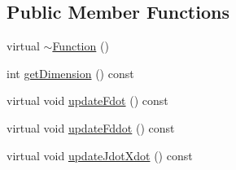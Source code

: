 \subsection*{Public Member Functions}
\begin{DoxyCompactItemize}
\item 
virtual \hyperlink{classocra_1_1Function_a1889abdbc50386e4b4710912dbba89bd}{$\sim$\+Function} ()
\item 
int \hyperlink{classocra_1_1Function_ae07e918d152c0cfdefaf0721c25cce33}{get\+Dimension} () const 
\item 
virtual void \hyperlink{classocra_1_1Function_a9539d82e42b9ec8c7cb9fa062b1b4f66}{update\+Fdot} () const 
\item 
virtual void \hyperlink{classocra_1_1Function_a77019526731059b7bfeea6a64201bca7}{update\+Fddot} () const 
\item 
virtual void \hyperlink{classocra_1_1Function_ae7b1200e00f8d9f2286120b84823657d}{update\+Jdot\+Xdot} () const 
\end{DoxyCompactItemize}
{\bf }\par
